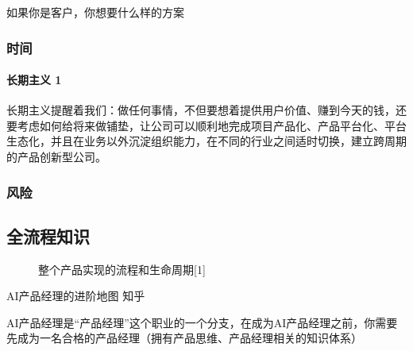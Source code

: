 \documentclass[letterpaper,11pt,english]{sphinxmanual}
\begin{document}
如果你是客户，你想要什么样的方案


\subsubsection{时间}
\label{\detokenize{chapter_idea/time:id1}}\label{\detokenize{chapter_idea/time::doc}}

\paragraph{长期主义 1\sphinxfootnotemark[402]}
\label{\detokenize{chapter_idea/time:id2}}%
\begin{footnotetext}[402]\sphinxAtStartFootnote
{}
%
\end{footnotetext}\ignorespaces 
长期主义提醒着我们：做任何事情，不但要想着提供用户价值、赚到今天的钱，还要考虑如何给将来做铺垫，让公司可以顺利地完成项目产品化、产品平台化、平台生态化，并且在业务以外沉淀组织能力，在不同的行业之间适时切换，建立跨周期的产品创新型公司。


\subsubsection{风险}
\label{\detokenize{chapter_idea/risk:id1}}\label{\detokenize{chapter_idea/risk::doc}}

\subsection{全流程知识}
\label{\detokenize{chapter_knowledge/index:chap-skill}}\label{\detokenize{chapter_knowledge/index:id1}}\label{\detokenize{chapter_knowledge/index::doc}}
\begin{figure}[H]
\centering
\capstart

\noindent{}
\caption{整个产品实现的流程和生命周期{[}1{]}}\label{\detokenize{chapter_knowledge/index:id2}}\end{figure}


AI产品经理的进阶地图 \sphinxhyphen{} 知乎

AI产品经理是“产品经理”这个职业的一个分支，在成为AI产品经理之前，你需要先成为一名合格的产品经理（拥有产品思维、产品经理相关的知识体系）
\end{document}
